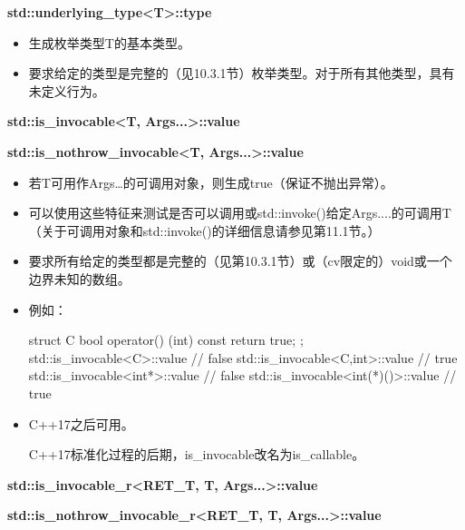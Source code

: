 \textbf{std::underlying\_type<T>::type}

\begin{itemize}
\item 
生成枚举类型T的基本类型。

\item 
要求给定的类型是完整的（见10.3.1节）枚举类型。对于所有其他类型，具有未定义行为。
\end{itemize}

\textbf{std::is\_invocable<T, Args...>::value}

\textbf{std::is\_nothrow\_invocable<T, Args...>::value}

\begin{itemize}
\item 
若T可用作Args…的可调用对象，则生成true（保证不抛出异常）。

\item 
可以使用这些特征来测试是否可以调用或std::invoke()给定Args....的可调用T（关于可调用对象和std::invoke()的详细信息请参见第11.1节。）

\item 
要求所有给定的类型都是完整的（见第10.3.1节）或（cv限定的）void或一个边界未知的数组。

\item 
例如：
\begin{cpp}
struct C {
	bool operator() (int) const {
		return true;
	}
};
std::is_invocable<C>::value // false
std::is_invocable<C,int>::value // true
std::is_invocable<int*>::value // false
std::is_invocable<int(*)()>::value // true
\end{cpp}

\item 
C++17之后可用。

\begin{notice}
C++17标准化过程的后期，is\_invocable改名为is\_callable。
\end{notice}
\end{itemize}

\textbf{std::is\_invocable\_r<RET\_T, T, Args...>::value}

\textbf{std::is\_nothrow\_invocable\_r<RET\_T, T, Args...>::value}

